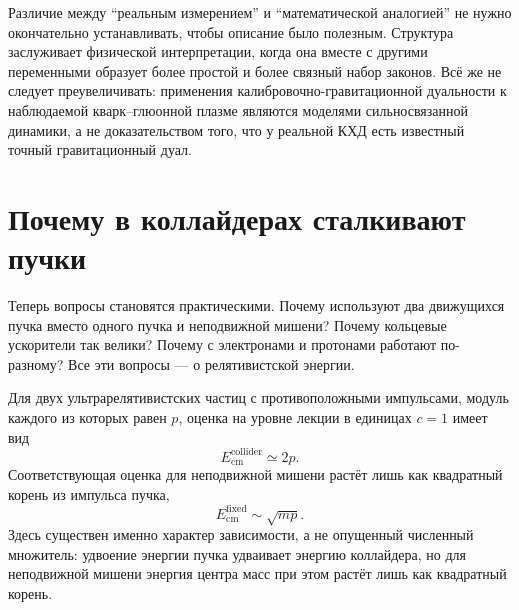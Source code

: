 Различие между ``реальным измерением'' и ``математической аналогией'' не нужно окончательно устанавливать, чтобы описание было полезным. Структура заслуживает физической интерпретации, когда она вместе с другими переменными образует более простой и более связный набор законов. Всё же не следует преувеличивать: применения калибровочно-гравитационной дуальности к наблюдаемой кварк--глюонной плазме являются моделями сильносвязанной динамики, а не доказательством того, что у реальной КХД есть известный точный гравитационный дуал.

\section{Почему в коллайдерах сталкивают пучки}

Теперь вопросы становятся практическими. Почему используют два движущихся пучка вместо одного пучка и неподвижной мишени? Почему кольцевые ускорители так велики? Почему с электронами и протонами работают по-разному? Все эти вопросы — о релятивистской энергии.

\begin{classroomqa}
\end{classroomqa}

Для двух ультрарелятивистских частиц с противоположными импульсами, модуль каждого из которых равен \(p\), оценка на уровне лекции в единицах \(c=1\) имеет вид
\begin{equation}
E_{\mathrm{cm}}^{\mathrm{collider}}\simeq 2p.
\end{equation}
Соответствующая оценка для неподвижной мишени растёт лишь как квадратный корень из импульса пучка,
\begin{equation}
E_{\mathrm{cm}}^{\mathrm{fixed}}\sim \sqrt{mp}.
\end{equation}
Здесь существен именно характер зависимости, а не опущенный численный множитель: удвоение энергии пучка удваивает энергию коллайдера, но для неподвижной мишени энергия центра масс при этом растёт лишь как квадратный корень.

